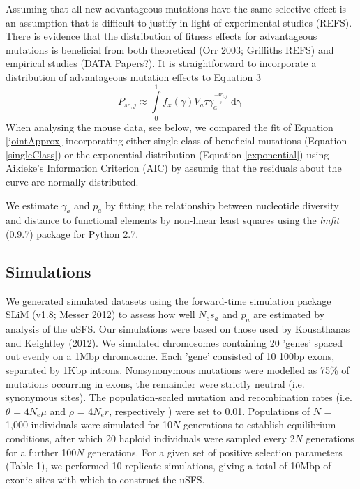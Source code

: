 \documentclass[11pt]{article}
\begin{document}
	Assuming that all new advantageous mutations have the same selective effect is an assumption that is difficult to justify in light of experimental studies (REFS). There is evidence that the distribution of fitness effects for advantageous mutations is beneficial from both theoretical (Orr 2003; Griffiths REFS) and empirical studies (DATA Papers?). It is straightforward to incorporate a distribution of advantageous mutation effects to Equation 3
		\begin{equation}
		\label{exponential}
P_{sc,j} \approx \int \limits_{0}^{1} f_x(\gamma) V_a \tau\gamma_a^{\frac{-4r_{i,j}}{s}} \mathop{d\gamma}
		\end{equation}
When analysing the mouse data, see below, we compared the fit of Equation \ref{jointApprox} incorporating either single class of beneficial mutations (Equation \ref{singleClass}) or the exponential distribution (Equation \ref{exponential}) using Aikieke's Information Criterion (AIC) by assumig that the residuals about the curve are normally distributed.

	
	We estimate $\gamma_a$ and $p_a$ by fitting the relationship between nucleotide diversity and distance to functional elements by non-linear least squares using the \emph{lmfit} (0.9.7) package for Python 2.7.
 
	\subsection*{Simulations}
	
	We generated simulated datasets using the forward-time simulation package SLiM (v1.8; Messer 2012) to assess how well $N_es_a$ and $p_a$ are estimated by analysis of the uSFS. Our simulations were based on those used by Kousathanas and Keightley (2012). We simulated chromosomes containing 20 'genes' spaced out evenly on a 1Mbp chromosome. Each 'gene' consisted of 10 100bp exons, separated by 1Kbp introns.  Nonsynonymous mutations were modelled as 75\% of mutations occurring in exons,  the remainder were strictly neutral (i.e. synonymous sites). The population-scaled mutation and recombination rates (i.e. $\theta$ = \emph{$4N_{e}\mu$} and $\rho$ = \emph{$4N_{e}r$}, respectively ) were set to 0.01. Populations of $N$ = 1,000 individuals were simulated for 10$N$ generations to establish equilibrium conditions, after which 20 haploid individuals were sampled every 2$N$ generations for a further 100$N$ generations. For a given set of positive selection parameters (Table 1), we performed 10 replicate simulations, giving a total of 10Mbp of exonic sites with which to construct the uSFS.
	
\end{document}
